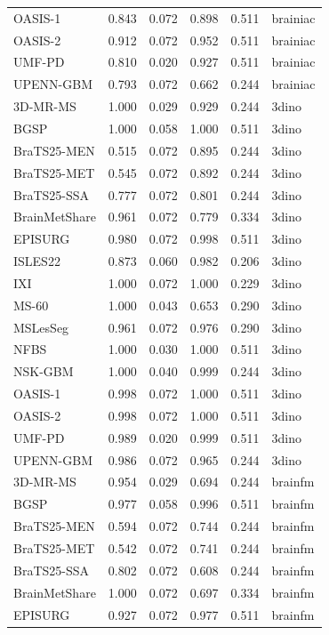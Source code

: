 \begin{tabular}{lrrrrl}
OASIS-1 & 0.843 & 0.072 & 0.898 & 0.511 & brainiac \\
OASIS-2 & 0.912 & 0.072 & 0.952 & 0.511 & brainiac \\
UMF-PD & 0.810 & 0.020 & 0.927 & 0.511 & brainiac \\
UPENN-GBM & 0.793 & 0.072 & 0.662 & 0.244 & brainiac \\
3D-MR-MS & 1.000 & 0.029 & 0.929 & 0.244 & 3dino \\
BGSP & 1.000 & 0.058 & 1.000 & 0.511 & 3dino \\
BraTS25-MEN & 0.515 & 0.072 & 0.895 & 0.244 & 3dino \\
BraTS25-MET & 0.545 & 0.072 & 0.892 & 0.244 & 3dino \\
BraTS25-SSA & 0.777 & 0.072 & 0.801 & 0.244 & 3dino \\
BrainMetShare & 0.961 & 0.072 & 0.779 & 0.334 & 3dino \\
EPISURG & 0.980 & 0.072 & 0.998 & 0.511 & 3dino \\
ISLES22 & 0.873 & 0.060 & 0.982 & 0.206 & 3dino \\
IXI & 1.000 & 0.072 & 1.000 & 0.229 & 3dino \\
MS-60 & 1.000 & 0.043 & 0.653 & 0.290 & 3dino \\
MSLesSeg & 0.961 & 0.072 & 0.976 & 0.290 & 3dino \\
NFBS & 1.000 & 0.030 & 1.000 & 0.511 & 3dino \\
NSK-GBM & 1.000 & 0.040 & 0.999 & 0.244 & 3dino \\
OASIS-1 & 0.998 & 0.072 & 1.000 & 0.511 & 3dino \\
OASIS-2 & 0.998 & 0.072 & 1.000 & 0.511 & 3dino \\
UMF-PD & 0.989 & 0.020 & 0.999 & 0.511 & 3dino \\
UPENN-GBM & 0.986 & 0.072 & 0.965 & 0.244 & 3dino \\
3D-MR-MS & 0.954 & 0.029 & 0.694 & 0.244 & brainfm \\
BGSP & 0.977 & 0.058 & 0.996 & 0.511 & brainfm \\
BraTS25-MEN & 0.594 & 0.072 & 0.744 & 0.244 & brainfm \\
BraTS25-MET & 0.542 & 0.072 & 0.741 & 0.244 & brainfm \\
BraTS25-SSA & 0.802 & 0.072 & 0.608 & 0.244 & brainfm \\
BrainMetShare & 1.000 & 0.072 & 0.697 & 0.334 & brainfm \\
EPISURG & 0.927 & 0.072 & 0.977 & 0.511 & brainfm \\

\end{tabular}
